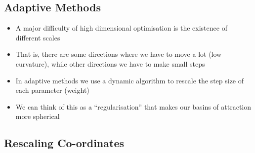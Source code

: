 \begin{slide}
  \section{Adaptive Methods}

  \begin{PauseHighLight}
    \begin{itemize}
    \item A major difficulty of high dimensional optimisation is the
      existence of different scales\pause
    \item That is, there are some directions where we have to move a
      lot (low curvature), while other directions we have to make small
      steps\pause
    \item In adaptive methods we use a dynamic algorithm to rescale
      the step size of each parameter (weight)\pause
    \item We can think of this as a ``regularisation'' that makes our
      basins of attraction more spherical\pause
    \end{itemize}
  \end{PauseHighLight}

\end{slide}


\begin{slide}
\section[-2]{Rescaling Co-ordinates}

\pb{}\pause{}
\begin{center}
  \pause
\end{center}
\end{slide}



